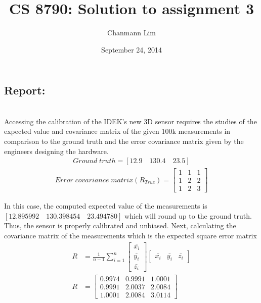 \documentclass[a4paper]{article}
\begin{document}
\title{CS 8790: Solution to assignment 3}
\author{Chanmann Lim}
\date{September 24, 2014}
\maketitle

\subsection*{Report:} ~\\
\indent Accessing the calibration of the IDEK's new 3D sensor requires the studies of the expected value and covariance matrix of 
the given 100k measurements in comparison to the ground truth and the error covariance matrix given by
the engineers designing the hardware. \\
\begin{align*}
Ground \; truth = [12.9 \quad 130.4 \quad 23.5]
\end{align*}
\begin{align*}
	Error \; covariance \; matrix (R_{True}) = 
	\begin{bmatrix}
		1 & 1 & 1 \\ 
		1 & 2 & 2 \\
		1 & 2 & 3
	\end{bmatrix}
\end{align*}

In this case, the computed expected value of the measurements is $[12.895992 \quad 130.398454 \quad 23.494780]$ which will
round up to the ground truth. Thus, the sensor is properly calibrated and unbiased. Next, calculating the covariance matrix 
of the measurements which is the expected square error matrix \\
\begin{align*}
R &=
\frac{1}{n-1}\sum_{i=1}^{n}
	\begin{bmatrix}
		\bar{x_i} \\
		\bar{y_i} \\
		\bar{z_i}
	\end{bmatrix}
	\begin{bmatrix}
		\bar{x_i} & \bar{y_i} & \bar{z_i}
	\end{bmatrix} \\
R &=
	\begin{bmatrix}
		0.9974  &  0.9991  &  1.0001 \\
    	0.9991  &  2.0037  &  2.0084 \\
    	1.0001  &  2.0084  &  3.0114
	\end{bmatrix}
\end{align*}
\end{document}
